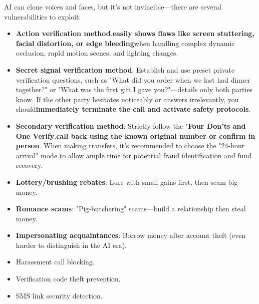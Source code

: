 
AI can clone voices and faces, but it's not invincible—there are several vulnerabilities to exploit:

\begin{itemize}
  \item \textbf{Action verification method}.\textbf{easily shows flaws like screen stuttering, facial distortion, or edge bleeding}when handling complex dynamic occlusion, rapid motion scenes, and lighting changes.
  \item \textbf{Secret signal verification method}: Establish and use preset private verification questions, such as "What did you order when we last had dinner together?" or "What was the first gift I gave you?"—details only both parties know. If the other party hesitates noticeably or answers irrelevantly, you should\textbf{immediately terminate the call and activate safety protocols}.
  \item \textbf{Secondary verification method}: Strictly follow the "\textbf{Four Don'ts and One Verify}.\textbf{call back using the known original number or confirm in person}. When making transfers, it's recommended to choose the "24-hour arrival" mode to allow ample time for potential fraud identification and fund recovery.
\end{itemize}


\begin{itemize}
  \item \textbf{Lottery/brushing rebates}: Lure with small gains first, then scam big money.
  \item \textbf{Romance scams}: "Pig-butchering" scams—build a relationship then steal money.
  \item \textbf{Impersonating acquaintances}: Borrow money after account theft (even harder to distinguish in the AI era).
\end{itemize}


\begin{itemize}
  \item Harassment call blocking.
  \item Verification code theft prevention.
  \item SMS link security detection.
\end{itemize}

